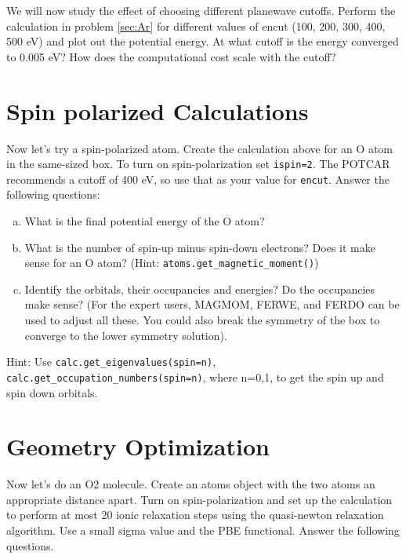 \documentclass[11pt]{article}
\begin{document}
We will now study the effect of choosing different planewave cutoffs. Perform the calculation in problem \ref{sec:Ar} for different values of encut (100, 200, 300, 400, 500 eV) and plot out the potential energy. At what cutoff is the energy converged to 0.005 eV? How does the computational cost scale with the cutoff?


\section{Spin polarized Calculations}
\label{sec-3}

Now let’s try a spin-polarized atom. Create the calculation above for an O atom in the same-sized box. To turn on spin-polarization set \verb~ispin=2~. The POTCAR recommends a cutoff of 400 eV, so use that as your value for \verb~encut~. Answer the following questions:

\begin{enumerate}[(a)]
\item What is the final potential energy of the O atom?

\item What is the number of spin-up minus spin-down electrons? Does it make sense for an O atom? (Hint: \verb~atoms.get_magnetic_moment()~)

\item Identify the orbitals, their occupancies and energies? Do the occupancies make sense? (For the expert users, MAGMOM, FERWE, and FERDO can be used to adjust all these. You could also break the symmetry of the box to converge to the lower symmetry solution).
\end{enumerate}

Hint: Use \verb~calc.get_eigenvalues(spin=n)~, \verb~calc.get_occupation_numbers(spin=n)~, where n=0,1, to get the spin up and spin down orbitals.

\section{Geometry Optimization}
\label{sec-4}

Now let’s do an O2 molecule. Create an atoms object with the two atoms an appropriate distance apart. Turn on spin-polarization and set up the calculation to perform at most 20 ionic relaxation steps using the quasi-newton relaxation algorithm. Use a small sigma value and the PBE functional. Answer the following questions.
\end{document}
